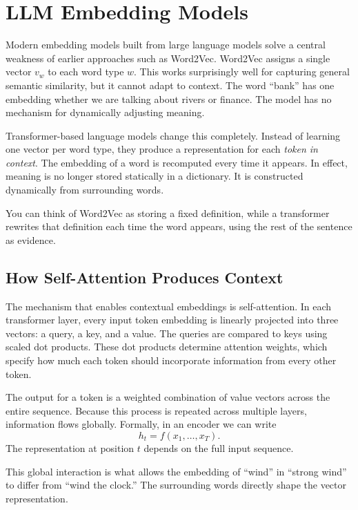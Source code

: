 \section{LLM Embedding Models}
\medskip

Modern embedding models built from large language models solve a central weakness of earlier approaches such as Word2Vec. Word2Vec assigns a single vector $v_w$ to each word type $w$. This works surprisingly well for capturing general semantic similarity, but it cannot adapt to context. The word ``bank'' has one embedding whether we are talking about rivers or finance. The model has no mechanism for dynamically adjusting meaning.

Transformer-based language models change this completely. Instead of learning one vector per word type, they produce a representation for each \emph{token in context}. The embedding of a word is recomputed every time it appears. In effect, meaning is no longer stored statically in a dictionary. It is constructed dynamically from surrounding words.

You can think of Word2Vec as storing a fixed definition, while a transformer rewrites that definition each time the word appears, using the rest of the sentence as evidence.

\bigskip
\subsection{How Self-Attention Produces Context}
\medskip

The mechanism that enables contextual embeddings is self-attention. In each transformer layer, every input token embedding is linearly projected into three vectors: a query, a key, and a value. The queries are compared to keys using scaled dot products. These dot products determine attention weights, which specify how much each token should incorporate information from every other token.

The output for a token is a weighted combination of value vectors across the entire sequence. Because this process is repeated across multiple layers, information flows globally. Formally, in an encoder we can write
\[
h_t = f(x_1, \dots, x_T).
\]
The representation at position $t$ depends on the full input sequence.

This global interaction is what allows the embedding of ``wind'' in ``strong wind'' to differ from ``wind the clock.'' The surrounding words directly shape the vector representation.


